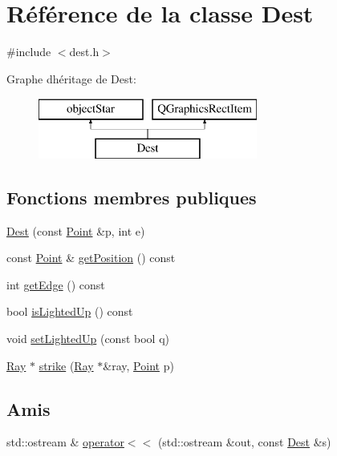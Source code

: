 \hypertarget{class_dest}{}\section{Référence de la classe Dest}
\label{class_dest}


{\ttfamily \#include $<$dest.\+h$>$}

Graphe d\textquotesingle{}héritage de Dest\+:\begin{figure}[H]
\begin{center}
\leavevmode
\includegraphics[height=2.000000cm]{class_dest}
\end{center}
\end{figure}
\subsection*{Fonctions membres publiques}
\begin{DoxyCompactItemize}
\item 
\mbox{\hyperlink{class_dest_a7d7223268dd4de01395367c9adb499e8}{Dest}} (const \mbox{\hyperlink{class_point}{Point}} \&p, int e)
\item 
const \mbox{\hyperlink{class_point}{Point}} \& \mbox{\hyperlink{class_dest_a0705b1cbab9df30ef1cef4807a324f98}{get\+Position}} () const
\item 
int \mbox{\hyperlink{class_dest_aa650b5bc32a2df18899cf811edd19ec7}{get\+Edge}} () const
\item 
bool \mbox{\hyperlink{class_dest_afc770857ab9f3089cfea805fa6a74f20}{is\+Lighted\+Up}} () const
\item 
void \mbox{\hyperlink{class_dest_ad18899d40086cc90594cce9f6e56468f}{set\+Lighted\+Up}} (const bool q)
\item 
\mbox{\hyperlink{class_ray}{Ray}} $\ast$ \mbox{\hyperlink{class_dest_aa48ab5e846f1dbad232bb59ea94c52ee}{strike}} (\mbox{\hyperlink{class_ray}{Ray}} $\ast$\&ray, \mbox{\hyperlink{class_point}{Point}} p)
\end{DoxyCompactItemize}
\subsection*{Amis}
\begin{DoxyCompactItemize}
\item 
std\+::ostream \& \mbox{\hyperlink{class_dest_a256a3d2bff5f10395424d5dc911a2b4e}{operator$<$$<$}} (std\+::ostream \&out, const \mbox{\hyperlink{class_dest}{Dest}} \&s)
\end{DoxyCompactItemize}


